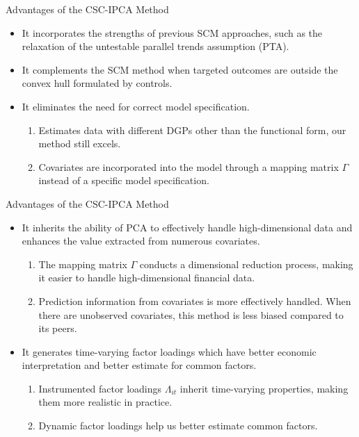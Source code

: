 \documentclass{beamer}
\begin{document}
\begin{frame}{Advantages of the CSC-IPCA Method}
    \begin{itemize}
        \item It incorporates the strengths of previous SCM approaches, such as the relaxation of the untestable parallel trends assumption (PTA).
        \item It complements the SCM method when targeted outcomes are outside the convex hull formulated by controls.
        \item It eliminates the need for correct model specification.
        \begin{enumerate}
            \item Estimates data with different DGPs other than the functional form, our method still excels.
            \item Covariates are incorporated into the model through a mapping matrix $\Gamma$ instead of a specific model specification.
        \end{enumerate}
    \end{itemize}
\end{frame}

\begin{frame}{Advantages of the CSC-IPCA Method}
    \begin{itemize}
        \item It inherits the ability of PCA to effectively handle high-dimensional data and enhances the value extracted from numerous covariates.
        \begin{enumerate}
            \item The mapping matrix $\Gamma$ conducts a dimensional reduction process, making it easier to handle high-dimensional financial data.
            \item Prediction information from covariates is more effectively handled. When there are unobserved covariates, this method is less biased compared to its peers.
        \end{enumerate}

        \item It generates time-varying factor loadings which have better economic interpretation and better estimate for common factors.
        \begin{enumerate}
            \item Instrumented factor loadings $\Lambda_{it}$ inherit time-varying properties, making them more realistic in practice.
            \item Dynamic factor loadings help us better estimate common factors.
        \end{enumerate}
    \end{itemize}
\end{frame}
\end{document}
